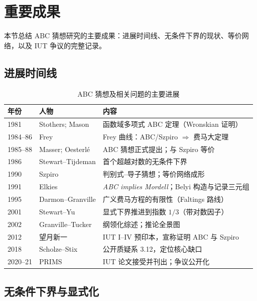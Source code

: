 \section{重要成果}\label{sec:results}

本节总结 ABC 猜想研究的主要成果：进展时间线、无条件下界的现状、等价网络，以及 IUT 争议的完整记录。

\subsection{进展时间线}

\begin{table}[htbp]
    \centering
    \caption{ABC 猜想及相关问题的主要进展}
    \label{tab:timeline}
    \begin{tabular}{llp{7.8cm}}
        \toprule
        年份 & 人物 & 内容 \\
        \midrule
        1981 & Stothers; Mason & 函数域多项式 ABC 定理（Wronskian 证明） \\
        1984--86 & Frey & Frey 曲线：ABC/Szpiro $\Rightarrow$ 费马大定理 \\
        1985--88 & Masser; Oesterl\'e & ABC 猜想正式提出；与 Szpiro 等价 \\
        1986 & Stewart--Tijdeman & 首个超越对数的无条件下界 \\
        1990 & Szpiro & 判别式--导子猜想；等价网络成形 \\
        1991 & Elkies & \textit{ABC implies Mordell}；Belyi 构造与记录三元组 \\
        1995 & Darmon--Granville & 广义费马方程的有限性（Faltings 路线） \\
        2001 & Stewart--Yu & 显式下界推进到指数 $1/3$（带对数因子） \\
        2002 & Granville--Tucker & 纲领化综述；推论全景图 \\
        2012 & 望月新一 & IUT I--IV 预印本，宣称证明 ABC 与 Szpiro \\
        2018 & Scholze--Stix & 公开质疑系 3.12，定位核心缺口 \\
        2020--21 & PRIMS & IUT 论文接受并刊出；争议公开化 \\
        \bottomrule
    \end{tabular}
\end{table}

\subsection{无条件下界与显式化}

